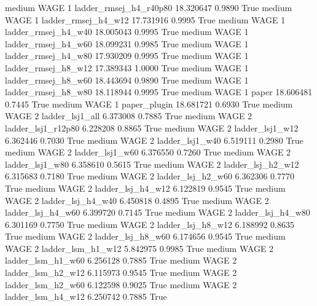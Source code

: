     medium     WAGE                 1 ladder_rmsej_h4_r40p80  18.320647      0.9890    True
    medium     WAGE                 1    ladder_rmsej_h4_w12  17.731916      0.9995    True
    medium     WAGE                 1    ladder_rmsej_h4_w40  18.005043      0.9995    True
    medium     WAGE                 1    ladder_rmsej_h4_w60  18.099231      0.9985    True
    medium     WAGE                 1    ladder_rmsej_h4_w80  17.930209      0.9995    True
    medium     WAGE                 1    ladder_rmsej_h8_w12  17.389343      1.0000    True
    medium     WAGE                 1    ladder_rmsej_h8_w60  18.443694      0.9890    True
    medium     WAGE                 1    ladder_rmsej_h8_w80  18.118944      0.9995    True
    medium     WAGE                 1                  paper  18.606481      0.7445    True
    medium     WAGE                 1           paper_plugin  18.681721      0.6930    True
    medium     WAGE                 2        ladder_lsj1_all   6.373008      0.7885    True
    medium     WAGE                 2     ladder_lsj1_r12p80   6.228208      0.8865    True
    medium     WAGE                 2        ladder_lsj1_w12   6.362446      0.7030    True
    medium     WAGE                 2        ladder_lsj1_w40   6.519111      0.2980    True
    medium     WAGE                 2        ladder_lsj1_w60   6.376550      0.7260    True
    medium     WAGE                 2        ladder_lsj1_w80   6.358610      0.5615    True
    medium     WAGE                 2      ladder_lsj_h2_w12   6.315683      0.7180    True
    medium     WAGE                 2      ladder_lsj_h2_w60   6.362306      0.7770    True
    medium     WAGE                 2      ladder_lsj_h4_w12   6.122819      0.9545    True
    medium     WAGE                 2      ladder_lsj_h4_w40   6.450818      0.4895    True
    medium     WAGE                 2      ladder_lsj_h4_w60   6.399720      0.7145    True
    medium     WAGE                 2      ladder_lsj_h4_w80   6.301169      0.7750    True
    medium     WAGE                 2      ladder_lsj_h8_w12   6.188992      0.8635    True
    medium     WAGE                 2      ladder_lsj_h8_w60   6.174656      0.9545    True
    medium     WAGE                 2      ladder_lsm_h1_w12   5.842975      0.9985    True
    medium     WAGE                 2      ladder_lsm_h1_w60   6.256128      0.7885    True
    medium     WAGE                 2      ladder_lsm_h2_w12   6.115973      0.9545    True
    medium     WAGE                 2      ladder_lsm_h2_w60   6.122598      0.9025    True
    medium     WAGE                 2      ladder_lsm_h4_w12   6.250742      0.7885    True
